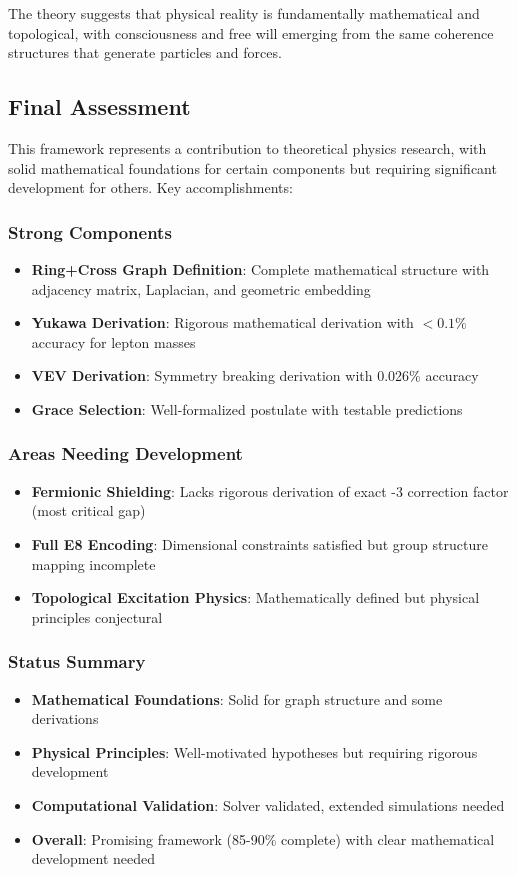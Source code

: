 \documentclass[12pt,a4paper]{article}
\begin{document}
\begin{itemize}
\begin{itemize}
The theory suggests that physical reality is fundamentally mathematical and topological, with consciousness and free will emerging from the same coherence structures that generate particles and forces.

\subsection{Final Assessment}

This framework represents a contribution to theoretical physics research, with solid mathematical foundations for certain components but requiring significant development for others. Key accomplishments:

\subsubsection{Strong Components}
\begin{itemize}
\item \textbf{Ring+Cross Graph Definition}: Complete mathematical structure with adjacency matrix, Laplacian, and geometric embedding
\item \textbf{Yukawa Derivation}: Rigorous mathematical derivation with $<0.1\%$ accuracy for lepton masses
\item \textbf{VEV Derivation}: Symmetry breaking derivation with 0.026\% accuracy
\item \textbf{Grace Selection}: Well-formalized postulate with testable predictions
\end{itemize}

\subsubsection{Areas Needing Development}
\begin{itemize}
\item \textbf{Fermionic Shielding}: Lacks rigorous derivation of exact -3 correction factor (most critical gap)
\item \textbf{Full E8 Encoding}: Dimensional constraints satisfied but group structure mapping incomplete
\item \textbf{Topological Excitation Physics}: Mathematically defined but physical principles conjectural
\end{itemize}

\subsubsection{Status Summary}
\begin{itemize}
\item \textbf{Mathematical Foundations}: Solid for graph structure and some derivations
\item \textbf{Physical Principles}: Well-motivated hypotheses but requiring rigorous development
\item \textbf{Computational Validation}: Solver validated, extended simulations needed
\item \textbf{Overall}: Promising framework (85-90\% complete) with clear mathematical development needed
\end{itemize}


\end{itemize}
\end{itemize}
\end{document}
